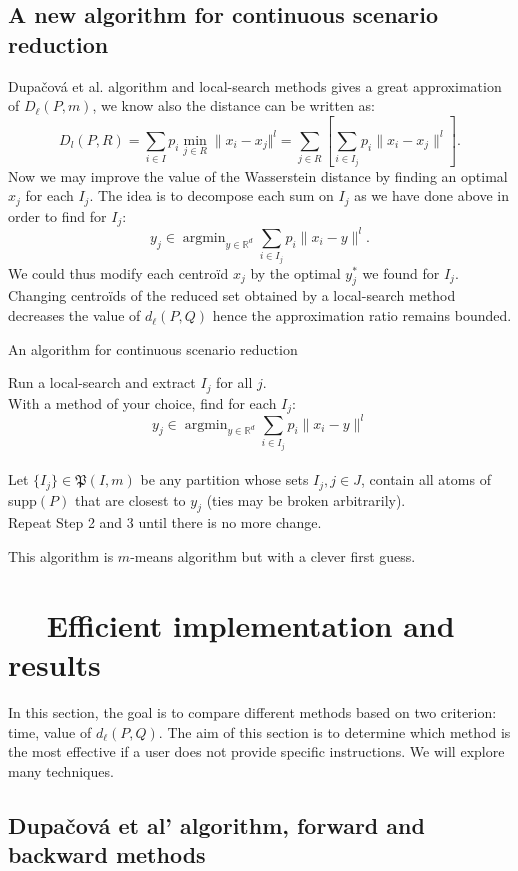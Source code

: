 \documentclass{amsart}
\newcommand{\argmin}{\mathop{\arg\min}}
\newcommand{\RR}{\mathbb{R}}
\begin{document}
\subsection{A new algorithm for continuous scenario reduction}
Dupačová et al. algorithm and local-search methods gives a great approximation of $D_\ell\left(P,m\right)$, we know also the distance can be written as:
$$D_l\left(P,R\right)=\sum_{i\in I}p_i\min_{j\in R}\lVert x_i-x_j\Vert^l=\sum_{j\in R}\left[\sum_{i\in I_j}p_i\lVert x_i-x_j\rVert^l\right].$$
Now we may improve the value of the Wasserstein distance by finding an optimal $x_j$ for each $I_j$. The idea is to decompose each sum on $I_j$ as we have done above in order to find for $I_j$: 
$$
y_j\in \argmin_{y\in\RR^d}\sum_{i\in I_j}p_i\lVert x_i-y\rVert^l.
$$
We could thus modify each centroïd $x_j$ by the optimal $y^*_j$ we found for $I_j$. Changing centroïds of the reduced set obtained by a local-search method decreases the value of $d_\ell\left(P,Q\right)$ hence the approximation ratio remains bounded. 

\begin{algorithm}[h]\caption{An algorithm for continuous scenario reduction}
    \label{improved ls}
    Run a local-search and extract $I_j$ for all $j$. \\
    With a method of your choice, find for each $I_j$: $$y_j\in\argmin_{y\in\RR^d}\sum_{i\in I_j}p_i\lVert x_i-y\rVert^l$$
    \\ Let $\{I_j\}\in\mathfrak{P}\left(I,m\right)$ be any partition whose sets $I_j, j\in J$, contain all atoms of supp$\left(P\right)$ that are closest to $y_j$ (ties may be broken arbitrarily). \\
    Repeat Step 2 and 3 until there is no more change.
\end{algorithm}

This algorithm is $m$-means algorithm but with a clever first guess.

\section{$\quad$ Efficient implementation and results}\label{fast}
In this section, the goal is to compare different methods based on two criterion: time, value of $d_\ell\left(P,Q\right)$. The aim of this section is to determine which method is the most effective if a user does not provide specific instructions. We will explore many techniques. 
\subsection{Dupačová et al' algorithm, forward and backward methods}
\end{document}
